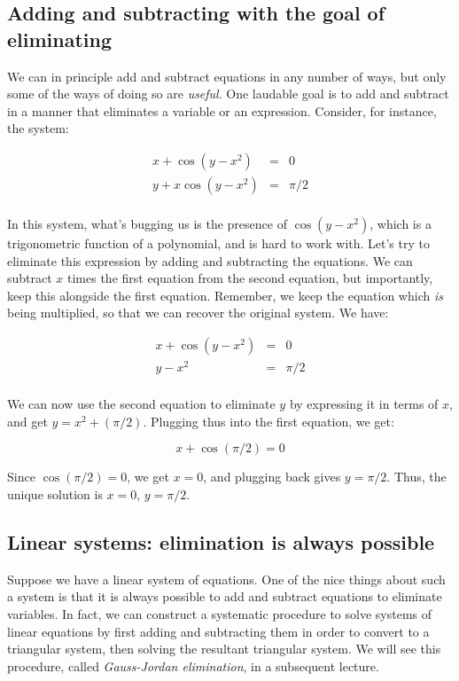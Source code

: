 \documentclass[10pt]{amsart}
\begin{document}
\subsection{Adding and subtracting with the goal of eliminating}

We can in principle add and subtract equations in any number of ways,
but only some of the ways of doing so are {\em useful}. One laudable
goal is to add and subtract in a manner that eliminates a variable or
an expression. Consider, for instance, the system:

\begin{eqnarray*}
  x + \cos(y - x^2) & = & 0\\
  y + x\cos(y - x^2) & = & \pi/2\\
\end{eqnarray*}

In this system, what's bugging us is the presence of $\cos(y - x^2)$,
which is a trigonometric function of a polynomial, and is hard to work
with. Let's try to eliminate this expression by adding and subtracting
the equations. We can subtract $x$ times the first equation from the
second equation, but importantly, keep this alongside the first
equation. Remember, we keep the equation which {\em is} being
multiplied, so that we can recover the original system. We have:

\begin{eqnarray*}
  x + \cos(y - x^2) & = & 0 \\
  y - x^2 &  = & \pi/2\\
\end{eqnarray*}

We can now use the second equation to eliminate $y$ by expressing it
in terms of $x$, and get $y = x^2 + (\pi/2)$. Plugging thus into the
first equation, we get:

$$x + \cos(\pi/2) = 0$$

Since $\cos(\pi/2) = 0$, we get $x = 0$, and plugging back gives $y =
\pi/2$. Thus, the unique solution is $x = 0$, $y = \pi/2$.

\subsection{Linear systems: elimination is always possible}

Suppose we have a linear system of equations. One of the nice things
about such a system is that it is always possible to add and subtract
equations to eliminate variables. In fact, we can construct a
systematic procedure to solve systems of linear equations by first
adding and subtracting them in order to convert to a triangular
system, then solving the resultant triangular system. We will see this
procedure, called {\em Gauss-Jordan elimination}, in a subsequent lecture.
\end{document}
